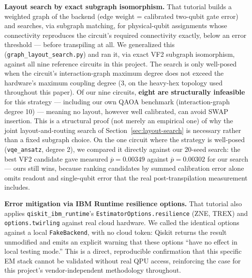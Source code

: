 \documentclass[9pt,twocolumn]{extarticle}
\begin{document}
\textbf{Layout search by exact subgraph isomorphism.} That tutorial builds a
weighted graph of the backend (edge weight = calibrated two-qubit gate
error) and searches, via subgraph matching, for physical-qubit assignments
whose connectivity reproduces the circuit's required connectivity exactly,
below an error threshold --- before transpiling at all. We generalized this
(\texttt{graph\_layout\_search.py}) and ran it, via exact VF2 subgraph
isomorphism, against all nine reference circuits in this project. The
search is only well-posed when the circuit's interaction-graph maximum
degree does not exceed the hardware's maximum coupling degree (3, on the
heavy-hex topology used throughout this paper). Of our nine circuits,
\textbf{eight are structurally infeasible} for this strategy --- including
our own QAOA benchmark (interaction-graph degree 10) --- meaning no layout,
however well calibrated, can avoid SWAP insertion. This is a structural
proof (not merely an empirical one) of why the joint layout-and-routing
search of Section~\ref{sec:layout-search} is necessary rather than a fixed
subgraph choice. On the one circuit where the strategy is well-posed
(\texttt{vqe\_ansatz}, degree 2), we compared it directly against our
20-seed search: the best VF2 candidate gave measured $\overline{p}=0.00349$
against $\overline{p}=0.00302$ for our search --- ours still wins, because
ranking candidates by summed calibration error alone omits readout and
single-qubit error that the real post-transpilation measurement includes.

\textbf{Error mitigation via IBM Runtime resilience options.} That tutorial
also applies \texttt{qiskit\_ibm\_runtime}'s
\texttt{EstimatorOptions.resilience} (ZNE, TREX) and
\texttt{options.twirling} against real cloud hardware. We called the
identical options against a local \texttt{FakeBackend}, with no cloud
token: Qiskit returns the result unmodified and emits an explicit warning
that these options ``have no effect in local testing mode.'' This is a
direct, reproducible confirmation that this specific EM stack cannot be
validated without real QPU access, reinforcing the case for this project's
vendor-independent methodology throughout.
\end{document}
